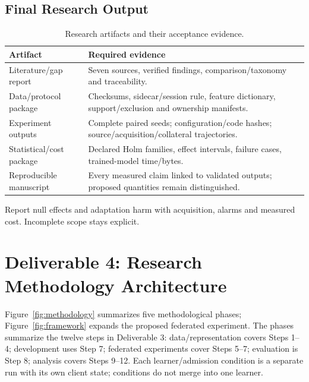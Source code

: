 \documentclass[10pt,a4paper]{article}
\begin{document}
\subsection{Final Research Output}
\begin{table}[htbp]
\centering\footnotesize
\caption{Research artifacts and their acceptance evidence.}
\label{tab:artifacts}
\begin{tabularx}{\linewidth}{L{3.2cm}Y}
\toprule
Artifact & Required evidence\\
\midrule
Literature/gap report & Seven sources, verified findings, comparison/taxonomy and traceability.\\
Data/protocol package & Checksums, sidecar/session rule, feature dictionary, support/exclusion and ownership manifests.\\
Experiment outputs & Complete paired seeds; configuration/code hashes; source/acquisition/collateral trajectories.\\
Statistical/cost package & Declared Holm families, effect intervals, failure cases, trained-model time/bytes.\\
Reproducible manuscript & Every measured claim linked to validated outputs; proposed quantities remain distinguished.\\
\bottomrule
\end{tabularx}
\end{table}
Report null effects and adaptation harm with acquisition, alarms and measured cost. Incomplete scope stays explicit.

\section{Deliverable 4: Research Methodology Architecture}
Figure~\ref{fig:methodology} summarizes five methodological phases; Figure~\ref{fig:framework} expands the proposed federated experiment. The phases summarize the twelve steps in Deliverable 3: data/representation covers Steps 1--4; development uses Step 7; federated experiments cover Steps 5--7; evaluation is Step 8; analysis covers Steps 9--12. Each learner/admission condition is a separate run with its own client state; conditions do not merge into one learner.
\end{document}
